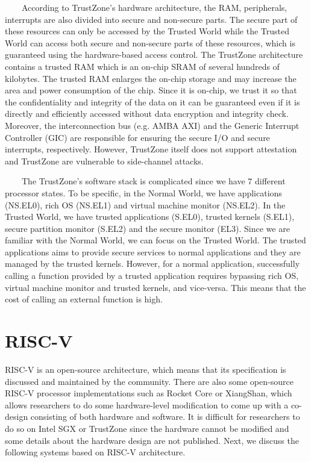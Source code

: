 \documentclass[12pt,twoside]{report}
\begin{document}
\ \ \ \ According to TrustZone's hardware architecture\cite{trustzone-system-arch}, the RAM, peripherals, interrupts are also divided into secure and non-secure parts. The secure part of these resources can only be accessed by the Trusted World while the Trusted World can access both secure and non-secure parts of these resources, which is guaranteed using the hardware-based access control. The TrustZone architecture contains a trusted RAM which is an on-chip SRAM of several hundreds of kilobytes. The trusted RAM enlarges the on-chip storage and may increase the area and power consumption of the chip. Since it is on-chip, we trust it so that the confidentiality and integrity of the data on it can be guaranteed even if it is directly and efficiently accessed without data encryption and integrity check. Moreover, the interconnection bus (e.g. AMBA AXI) and the Generic Interrupt Controller (GIC) are responsible for ensuring the secure I/O and secure interrupts, respectively. However, TrustZone itself does not support attestation and TrustZone are vulnerable to side-channel attacks\cite{bukasa2017trustzone}.

\ \ \ \ The TrustZone's software stack is complicated since we have 7 different processor states. To be specific, in the Normal World, we have applications (NS.EL0), rich OS (NS.EL1) and virtual machine monitor (NS.EL2). In the Trusted World, we have trusted applications (S.EL0), trusted kernels (S.EL1), secure partition monitor (S.EL2) and the secure monitor (EL3). Since we are familiar with the Normal World, we can focus on the Trusted World. The trusted applications aims to provide secure services to normal applications and they are managed by the trusted kernels. However, for a normal application, successfully calling a function provided by a trusted application requires bypassing rich OS, virtual machine monitor and trusted kernels, and vice-versa. This means that the cost of calling an external function is high.

\section{RISC-V}

RISC-V\cite{riscv-privileged-spec} is an open-source architecture, which means that its specification is discussed and maintained by the community. There are also some open-source RISC-V processor implementations such as Rocket Core\cite{rocket-core} or XiangShan\cite{xiangshan}, which allows researchers to do some hardware-level modification to come up with a co-design consisting of both hardware and software. It is difficult for researchers to do so on Intel SGX or TrustZone since the hardware cannot be modified and some details about the hardware design are not published. Next, we discuss the following systems based on RISC-V architecture.
\end{document}
